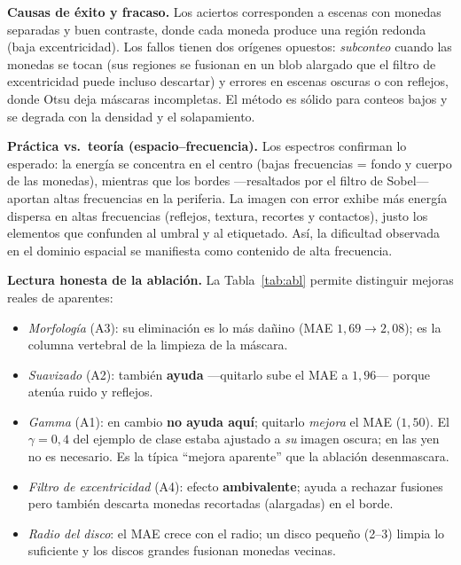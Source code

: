 \documentclass[11pt,a4paper]{article}
\begin{document}
\textbf{Causas de éxito y fracaso.} Los aciertos corresponden a escenas con monedas separadas y buen
contraste, donde cada moneda produce una región redonda (baja excentricidad). Los fallos tienen dos
orígenes opuestos: \emph{subconteo} cuando las monedas se tocan (sus regiones se fusionan en un blob
alargado que el filtro de excentricidad puede incluso descartar) y errores en escenas oscuras o con
reflejos, donde Otsu deja máscaras incompletas. El método es sólido para conteos bajos y se degrada con la
densidad y el solapamiento.

\textbf{Práctica vs.\ teoría (espacio--frecuencia).} Los espectros confirman lo esperado: la energía se
concentra en el centro (bajas frecuencias = fondo y cuerpo de las monedas), mientras que los bordes
---resaltados por el filtro de Sobel--- aportan altas frecuencias en la periferia. La imagen con error
exhibe más energía dispersa en altas frecuencias (reflejos, textura, recortes y contactos), justo los
elementos que confunden al umbral y al etiquetado. Así, la dificultad observada en el dominio espacial se
manifiesta como contenido de alta frecuencia.

\textbf{Lectura honesta de la ablación.} La Tabla~\ref{tab:abl} permite distinguir mejoras reales de
aparentes:
\begin{itemize}
\item \emph{Morfología} (A3): su eliminación es lo más dañino (MAE $1{,}69\rightarrow2{,}08$); es la
columna vertebral de la limpieza de la máscara.
\item \emph{Suavizado} (A2): también \textbf{ayuda} ---quitarlo sube el MAE a $1{,}96$--- porque atenúa
ruido y reflejos.
\item \emph{Gamma} (A1): en cambio \textbf{no ayuda aquí}; quitarlo \emph{mejora} el MAE ($1{,}50$). El
$\gamma=0{,}4$ del ejemplo de clase estaba ajustado a \emph{su} imagen oscura; en las yen no es necesario.
Es la típica ``mejora aparente'' que la ablación desenmascara.
\item \emph{Filtro de excentricidad} (A4): efecto \textbf{ambivalente}; ayuda a rechazar fusiones pero
también descarta monedas recortadas (alargadas) en el borde.
\item \emph{Radio del disco}: el MAE crece con el radio; un disco pequeño (2--3) limpia lo suficiente y los
discos grandes fusionan monedas vecinas.
\end{itemize}
\end{document}
